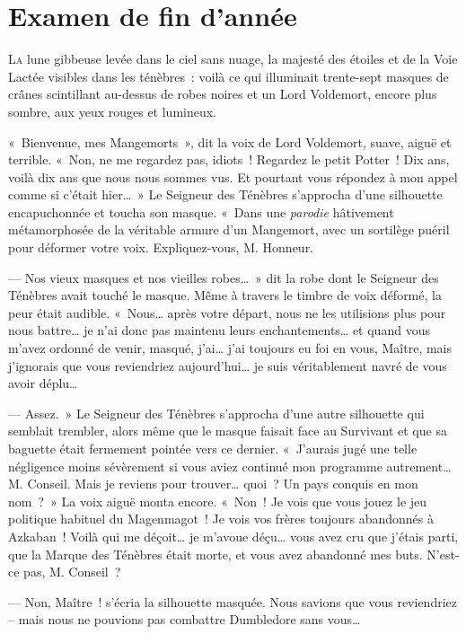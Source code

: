 \chapter{Examen de fin d’année}

\lettrine{L}{a} lune gibbeuse levée dans le ciel sans nuage, la majesté des étoiles et de la Voie Lactée visibles dans les ténèbres~: voilà ce qui illuminait trente-sept masques de crânes scintillant au-dessus de robes noires et un Lord Voldemort, encore plus sombre, aux yeux rouges et lumineux.

«~Bienvenue, mes Mangemorts~», dit la voix de Lord Voldemort, suave, aiguë et terrible.
«~Non, ne me regardez pas, idiots~!
Regardez le petit Potter~!
Dix ans, voilà dix ans que nous nous sommes vus.
Et pourtant vous répondez à mon appel comme si c'était hier…~»
Le Seigneur des Ténèbres s'approcha d'une silhouette encapuchonnée et toucha son masque.
«~Dans une \emph{parodie} hâtivement métamorphosée de la véritable armure d'un Mangemort, avec un sortilège puéril pour déformer votre voix.
Expliquez-vous, M. Honneur.

--- Nos vieux masques et nos vieilles robes…~»
dit la robe dont le Seigneur des Ténèbres avait touché le masque.
Même à travers le timbre de voix déformé, la peur était audible.
«~Nous… après votre départ, nous ne les utilisions plus pour nous battre… je n'ai donc pas maintenu leurs enchantements… et quand vous m'avez ordonné de venir, masqué, j'ai… j'ai toujours eu foi en vous, Maître, mais j'ignorais que vous reviendriez aujourd'hui… je suis véritablement navré de vous avoir déplu…

--- Assez.~»
Le Seigneur des Ténèbres s'approcha d'une autre silhouette qui semblait trembler, alors même que le masque faisait face au Survivant et que sa baguette était fermement pointée vers ce dernier.
«~J'aurais jugé une telle négligence moins sévèrement si vous aviez continué mon programme autrement…
M. Conseil.
Mais je reviens pour trouver… quoi~?
Un pays conquis en mon nom~?~»
La voix aiguë monta encore.
«~Non~! Je vois que vous jouez le jeu politique habituel du Magenmagot~!
Je vois vos frères toujours abandonnés à Azkaban~!
Voilà qui me déçoit… je m'avoue déçu… vous avez cru que j'étais parti, que la Marque des Ténèbres était morte, et vous avez abandonné mes buts.
N'est-ce pas, M. Conseil~?

--- Non, Maître~! s'écria la silhouette masquée.
Nous savions que vous reviendriez -- mais nous ne pouvions pas combattre Dumbledore sans vous…

